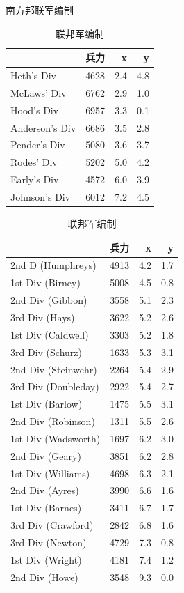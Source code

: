 \documentclass{sicnuthesis}
\begin{document}
\begin{table}[h]
\parbox{.45\linewidth}{
\caption{南方邦联军编制}
\begin{tabular}{lrrr}
\toprule
{} &  兵力 &    x &    y \\
\midrule
Heth's Div     &      4628 &  2.4 &  4.8 \\
McLaws' Div    &      6762 &  2.9 &  1.0 \\
Hood's Div     &      6957 &  3.3 &  0.1 \\
Anderson's Div &      6686 &  3.5 &  2.8 \\
Pender's Div   &      5080 &  3.6 &  3.7 \\
Rodes' Div     &      5202 &  5.0 &  4.2 \\
Early's Div    &      4572 &  6.0 &  3.9 \\
Johnson's Div  &      6012 &  7.2 &  4.5 \\
\bottomrule
\end{tabular}
\label{tab:Confederate}
}
\hfill
\parbox{.45\linewidth}{
\caption{联邦军编制}
\begin{tabular}{lrrr}
\toprule
{} &  兵力 &    x &    y \\
\midrule
2nd D (Humphreys)   &      4913 &  4.2 &  1.7 \\
1st Div (Birney)    &      5008 &  4.5 &  0.8 \\
2nd Div (Gibbon)    &      3558 &  5.1 &  2.3 \\
3rd Div (Hays)      &      3622 &  5.2 &  2.6 \\
1st Div (Caldwell)  &      3303 &  5.2 &  1.8 \\
3rd Div (Schurz)    &      1633 &  5.3 &  3.1 \\
2nd Div (Steinwehr) &      2264 &  5.4 &  2.9 \\
3rd Div (Doubleday) &      2922 &  5.4 &  2.7 \\
1st Div (Barlow)    &      1475 &  5.5 &  3.1 \\
2nd Div (Robinson)  &      1311 &  5.5 &  2.6 \\
1st Div (Wadsworth) &      1697 &  6.2 &  3.0 \\
2nd Div (Geary)     &      3851 &  6.2 &  2.8 \\
1st Div (Williams)  &      4698 &  6.3 &  2.1 \\
2nd Div (Ayres)     &      3990 &  6.6 &  1.6 \\
1st Div (Barnes)    &      3411 &  6.7 &  1.7 \\
3rd Div (Crawford)  &      2842 &  6.8 &  1.6 \\
3rd Div (Newton)    &      4729 &  7.3 &  0.8 \\
1st Div (Wright)    &      4181 &  7.4 &  1.2 \\
2nd Div (Howe)      &      3548 &  9.3 &  0.0 \\
\bottomrule
\end{tabular}
\label{tab:Union}
}
\end{table}
\end{document}
